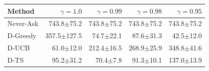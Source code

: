 \begin{tabular}{lrrrr}
\toprule
Method & $\gamma=1.0$ & $\gamma=0.99$ & $\gamma=0.98$ & $\gamma=0.95$ \\
\midrule
Never-Ask & 743.8{\scriptsize$\pm$75.2} & 743.8{\scriptsize$\pm$75.2} & 743.8{\scriptsize$\pm$75.2} & 743.8{\scriptsize$\pm$75.2} \\
D-Greedy & 357.5{\scriptsize$\pm$127.5} & 74.7{\scriptsize$\pm$22.1} & 87.6{\scriptsize$\pm$31.3} & 42.5{\scriptsize$\pm$12.0} \\
D-UCB & 61.0{\scriptsize$\pm$12.0} & 212.4{\scriptsize$\pm$16.5} & 268.9{\scriptsize$\pm$25.9} & 348.8{\scriptsize$\pm$41.6} \\
D-TS & 95.2{\scriptsize$\pm$31.2} & 70.4{\scriptsize$\pm$7.8} & 91.3{\scriptsize$\pm$10.1} & 137.0{\scriptsize$\pm$13.9} \\
\bottomrule
\end{tabular}
